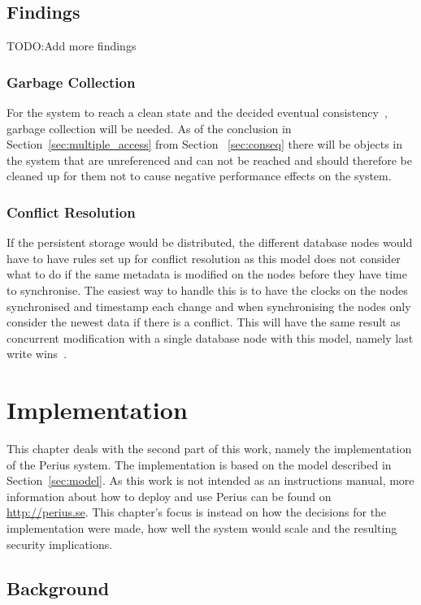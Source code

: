 \documentclass[a4paper,12pt]{article}
\newcommand{\fix}{\colorbox{yellow!30}{TODO:}}
\begin{document}
\subsection{Findings}
\fix Add more findings
\subsubsection{Garbage Collection}
For the system to reach a clean state and the decided eventual consistency~\cite{KLINGSBO}, garbage
collection will be needed. As of the conclusion in Section~\ref{sec:multiple_access} from Section
~\ref{sec:conseq} there will be objects in the system that are unreferenced and can not be reached
and should therefore be cleaned up for them not to cause negative performance effects on the system.

\subsubsection{Conflict Resolution} \label{sec:conflict_res}
If the persistent storage would be distributed, the different database nodes would have to have rules
set up for conflict resolution as this model does not consider what to do if the same metadata is
modified on the nodes before they have time to synchronise. The easiest way to handle this is to
have the clocks on the nodes synchronised and timestamp each change and when synchronising the nodes
only consider the newest data if there is a conflict. This will have the same result as concurrent
modification with a single database node with this model, namely last write
wins~\cite{LASTWRITEWINS}.

\newpage 
\section{Implementation} \label{sec:implementation} 
This chapter deals with the second part of this work, namely the implementation of the Perius
system. The implementation is based on the model described in Section~\ref{sec:model}. As this work
is not intended as an instructions manual, more information about how to deploy and use Perius can
be found on \url{http://perius.se}. This chapter's focus is instead on how the decisions for the
implementation were made, how well the system would scale and the resulting security implications.

\subsection{Background}
\end{document}
